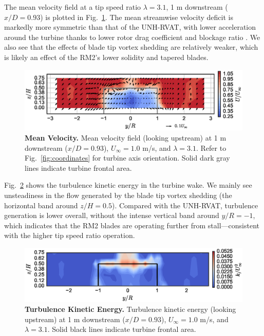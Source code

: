\documentclass[10pt,letterpaper]{article}
\begin{document}
The mean velocity field at a tip speed ratio $\lambda=3.1$, 1 m downstream
($x/D=0.93$) is plotted in Fig.~\ref{fig:meancontquiv}. The mean streamwise
velocity deficit is markedly more symmetric than that of the UNH-RVAT, with
lower acceleration around the turbine thanks to lower rotor drag coefficient and
blockage ratio \cite{Bachant2015-JoT}. We also see that the effects of blade tip
vortex shedding are relatively weaker, which is likely an effect of the RM2's
lower solidity and tapered blades.

\begin{figure}[h]
    \includegraphics[width=\textwidth]{figures/meancontquiv.eps}

    \caption{{\bf Mean Velocity.} Mean velocity field (looking upstream) at 1 m
    downstream ($x/D=0.93$), $U_\infty=1.0$ m/s, and $\lambda=3.1$. Refer to
    Fig.~\ref{fig:coordinates} for turbine axis orientation. Solid dark gray
    lines indicate turbine frontal area.}

    \label{fig:meancontquiv}
\end{figure}


Fig.~\ref{fig:kcont} shows the turbulence kinetic energy in the turbine wake. We
mainly see unsteadiness in the flow generated by the blade tip vortex shedding
(the horizontal band around $z/H=0.5$). Compared with the UNH-RVAT, turbulence
generation is lower overall, without the intense vertical band around $y/R=-1$,
which indicates that the RM2 blades are operating further from
stall---consistent with the higher tip speed ratio operation.

\begin{figure}[h]
    \includegraphics[width=\textwidth]{figures/k_contours.eps}

    \caption{{\bf Turbulence Kinetic Energy.} Turbulence kinetic energy (looking
    upstream) at 1 m downstream ($x/D=0.93$), $U_\infty=1.0$ m/s, and
    $\lambda=3.1$. Solid black lines indicate turbine frontal area.}

    \label{fig:kcont}
\end{figure}
\end{document}

